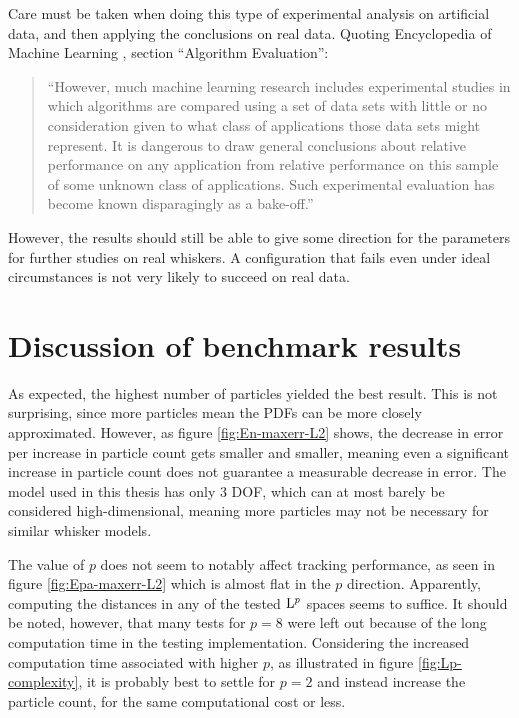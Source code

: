 

Care must be taken when doing this type of experimental analysis on
artificial data, and then applying the conclusions on real
data. Quoting Encyclopedia of Machine Learning
\cite{EncyclopediaMachineLearning}, section ``Algorithm Evaluation'':

\begin{quote}
  ``However, much machine learning research includes experimental
  studies in which algorithms are compared using a set of data sets
  with little or no consideration given to what class of applications
  those data sets might represent. It is dangerous to draw general
  conclusions about relative performance on any application from
  relative performance on this sample of some unknown class of
  applications. Such experimental evaluation has become known
  disparagingly as a bake-off.''
\end{quote}

However, the results should still be able to give some direction for
the parameters for further studies on real whiskers. A configuration
that fails even under ideal circumstances is not very likely to
succeed on real data.

\section{Discussion of benchmark results}
As expected, the highest number of particles yielded the best
result. This is not surprising, since more particles mean the PDFs can
be more closely approximated. However, as figure \ref{fig:En-maxerr-L2}
shows, the decrease in error per increase in particle count gets
smaller and smaller, meaning even a significant increase in particle
count does not guarantee a measurable decrease in error. The model
used in this thesis has only 3 DOF, which can at most barely be
considered high-dimensional, meaning more particles may not be
necessary for similar whisker models.

The value of $p$ does not seem to notably affect tracking performance,
as seen in figure \ref{fig:Epa-maxerr-L2} which is almost flat in the
$p$ direction. Apparently, computing the distances in any of the
tested $\mathrm{L}^{p}$ spaces seems to suffice. It should be noted, however,
that many tests for $p=8$ were left out because of the long
computation time in the testing implementation. Considering the
increased computation time associated with higher $p$, as illustrated
in figure \ref{fig:Lp-complexity}, it is probably best to settle for
$p=2$ and instead increase the particle count, for the same
computational cost or less.

